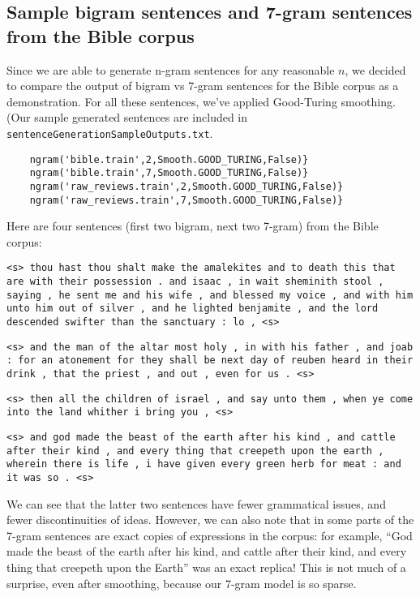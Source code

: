 \documentclass{article}
\begin{document}
\subsection{Sample bigram sentences and 7-gram sentences from the Bible corpus}
Since we are able to generate n-gram sentences for any reasonable $n$, we decided to compare the output of bigram vs 7-gram sentences for the Bible corpus as a demonstration. For all these sentences, we've applied Good-Turing smoothing. (Our sample generated sentences are included in \texttt{sentenceGenerationSampleOutputs.txt}.
\begin{verbatim}
    ngram('bible.train',2,Smooth.GOOD_TURING,False)}
    ngram('bible.train',7,Smooth.GOOD_TURING,False)}
    ngram('raw_reviews.train',2,Smooth.GOOD_TURING,False)}
    ngram('raw_reviews.train',7,Smooth.GOOD_TURING,False)}
\end{verbatim}

\begin{adjustwidth}{0.25in}{0.5in}
\setlength{\parindent}{-0.15in}
Here are four sentences (first two bigram, next two 7-gram) from the Bible corpus:\par
{\small
\texttt{<s> thou hast thou shalt make the amalekites and to death this that are with their possession . and isaac , in wait sheminith stool , saying , he sent me and his wife , and blessed my voice , and with him unto him out of silver , and he lighted benjamite , and the lord descended swifter than the sanctuary : lo , <s>}\par
\texttt{<s> and the man of the altar most holy , in with his father , and joab : for an atonement for they shall be next day of reuben heard in their drink , that the priest , and out , even for us . <s>}\par\smallskip

\texttt{<s> then all the children of israel , and say unto them , when ye come into the land whither i bring you , <s>}\par
\texttt{<s> and god made the beast of the earth after his kind , and cattle after their kind , and every thing that creepeth upon the earth , wherein there is life , i have given every green herb for meat : and it was so . <s>}\par\smallskip
}
We can see that the latter two sentences have fewer grammatical issues, and fewer discontinuities of ideas. However, we can also note that in some parts of the 7-gram sentences are exact copies of expressions in the corpus: for example, ``God made the beast of the earth after his kind, and cattle
after their kind, and every thing that creepeth upon the Earth'' was an exact replica! This is not much of a surprise, even after smoothing, because our 7-gram model is so sparse.
\end{adjustwidth}
\end{document}
